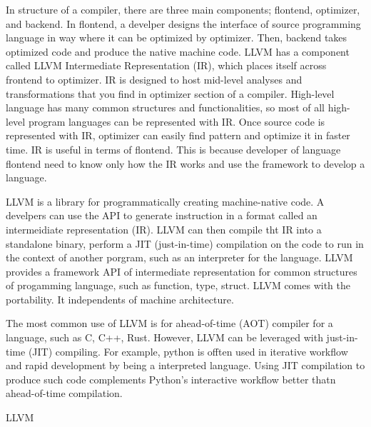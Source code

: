 In structure of a compiler, there are three main components; flontend, optimizer, and backend. 
In flontend, a develper designs the interface of source programming language in way where it can be optimized by optimizer. 
Then, backend takes optimized code and produce the native machine code. LLVM has a component called LLVM Intermediate Representation (IR), 
which places itself across frontend to optimizer. IR is designed to host mid-level analyses and transformations that you find in optimizer section of a compiler.
High-level language has many common structures and functionalities, so most of all high-level program languages can be represented with IR. 
Once source code is represented with IR, optimizer can easily find pattern and optimize it in faster time. 
IR is useful in terms of flontend. This is because developer of language flontend need to know only how the IR works and use the framework to develop a language.




LLVM is a library for programmatically creating machine-native code. A develpers can use the API to generate instruction in a format 
called an intermeidiate representation (IR). LLVM can then compile tht IR into a standalone binary, 
perform a JIT (just-in-time) compilation on the code to run in the context of another porgram, such as an interpreter for the language.
LLVM provides a framework API of intermediate representation for common structures of progamming language, such as function, type, struct.
LLVM comes with the portability. It independents of machine architecture. 

The most common use of LLVM is for ahead-of-time (AOT) compiler for a language, such as C, C++, Rust. 
However, LLVM can be leveraged with just-in-time (JIT) compiling. 
For example, python is offten used in iterative workflow and rapid development by being a interpreted language.
Using JIT compilation to produce such code complements Python's interactive workflow better thatn ahead-of-time compilation.

LLVM